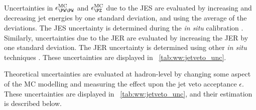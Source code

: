 Uncertainties in $\epsilon^{\text{MC}}_{\WW}$ and $\epsilon^{\text{MC}}_{\PZ}$ due to the 
JES are evaluated by increasing and decreasing jet energies by one standard deviation, 
and using the average of the deviations. The JES uncertainty is determined during the 
\textit{in situ} calibration \cite{Jets:Calib:2011}. Similarly, uncertainties due to the 
JER are evaluated by increasing the JER by one standard deviation. The JER uncertainty is 
determined using other \textit{in situ} techniques \cite{Jets:JER:2011}. These 
uncertainties are displayed in \Table~\ref{tab:ww:jetveto_unc}.

Theoretical uncertainties are evaluated at hadron-level by changing some aspect of the MC 
modelling and measuring the effect upon the jet veto acceptance $\epsilon$. These 
uncertainties are 
displayed in \Table~\ref{tab:ww:jetveto_unc}, and their estimation is described below.

